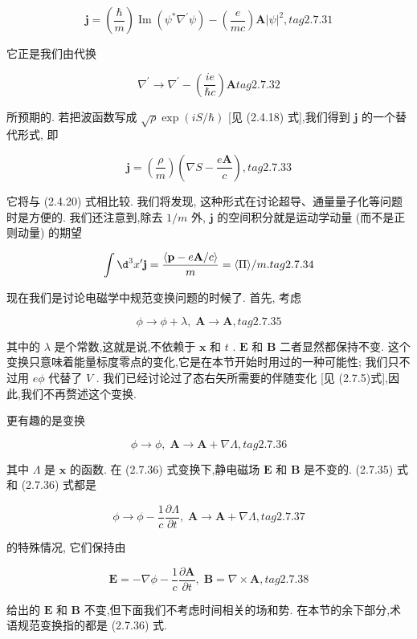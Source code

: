 \documentclass[lang=cn,newtx,10pt,scheme=chinese,thmcnt=section]{elegantbook}
\begin{document}
$$
\mathbf{j} = \left( \frac{\hbar }{m}\right) \operatorname{Im}\left( {{\psi }^{ * }{\nabla }^{\prime }\psi }\right) - \left( \frac{e}{mc}\right) \mathbf{A}{\left| \psi \right| }^{2}, tag{2. 7.31}
$$

它正是我们由代换

$$
{\nabla }^{\prime } \rightarrow {\nabla }^{\prime } - \left( \frac{ie}{\hbar c}\right) \mathbf{A} tag{2. 7.32}
$$

所预期的. 若把波函数写成 $\sqrt{\rho }\exp \left( {{iS}/\hbar }\right)$ [见 (2.4.18) 式],我们得到 $\mathbf{j}$ 的一个替代形式, 即

$$
\mathbf{j} = \left( \frac{\rho }{m}\right) \left( {\nabla S - \frac{e\mathbf{A}}{c}}\right) , tag{2. 7.33}
$$

它将与 (2.4.20) 式相比较. 我们将发现, 这种形式在讨论超导、通量量子化等问题时是方便的. 我们还注意到,除去 $1/m$ 外, $\mathbf{j}$ 的空间积分就是运动学动量 (而不是正则动量) 的期望

$$
\int {\d}^{3}{x}^{\prime }\mathbf{j} = \frac{\langle \mathbf{p} - e\mathbf{A}/c\rangle }{m} = \langle \Pi \rangle /m. tag{2. 7.34}
$$

现在我们是讨论电磁学中规范变换问题的时候了. 首先, 考虑

$$
\phi \rightarrow \phi + \lambda ,\;\mathbf{A} \rightarrow \mathbf{A}, tag{2. 7.35}
$$

其中的 $\lambda$ 是个常数,这就是说,不依赖于 $\mathbf{x}$ 和 $t$ . $\mathbf{E}$ 和 $\mathbf{B}$ 二者显然都保持不变. 这个变换只意味着能量标度零点的变化,它是在本节开始时用过的一种可能性; 我们只不过用 ${e\phi }$ 代替了 $V$ . 我们已经讨论过了态右矢所需要的伴随变化 [见 (2.7.5)式],因此,我们不再赘述这个变换.

更有趣的是变换

$$
\phi \rightarrow \phi ,\;\mathbf{A} \rightarrow \mathbf{A} + \nabla \Lambda , tag{2. 7.36}
$$

其中 $\Lambda$ 是 $\mathbf{x}$ 的函数. 在 (2.7.36) 式变换下,静电磁场 $\mathbf{E}$ 和 $\mathbf{B}$ 是不变的. (2.7.35) 式和 (2.7.36) 式都是

$$
\phi \rightarrow \phi - \frac{1}{c}\frac{\partial \Lambda }{\partial t},\;\mathbf{A} \rightarrow \mathbf{A} + \nabla \Lambda , tag{2. 7.37}
$$

的特殊情况, 它们保持由

$$
\mathbf{E} = - \nabla \phi - \frac{1}{c}\frac{\partial \mathbf{A}}{\partial t},\;\mathbf{B} = \nabla \times \mathbf{A}, tag{2. 7.38}
$$

给出的 $\mathbf{E}$ 和 $\mathbf{B}$ 不变,但下面我们不考虑时间相关的场和势. 在本节的余下部分,术语规范变换指的都是 (2.7.36) 式.
\end{document}
